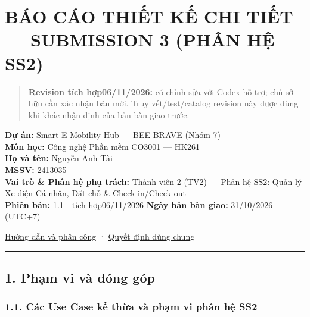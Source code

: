 \documentclass[11pt,a4paper]{article}
\begin{document}
\setcounter{page}{1}
\tableofcontents
\newpage

\hypertarget{buxe1o-cuxe1o-thiux1ebft-kux1ebf-chi-tiux1ebft-submission-3-phuxe2n-hux1ec7-ss2}{%
\section{BÁO CÁO THIẾT KẾ CHI TIẾT --- SUBMISSION 3 (PHÂN HỆ
SS2)}\label{buxe1o-cuxe1o-thiux1ebft-kux1ebf-chi-tiux1ebft-submission-3-phuxe2n-hux1ec7-ss2}}

\begin{quote}
\textbf{Revision tích hợp06/11/2026:} có chỉnh sửa với Codex hỗ trợ; chủ
sở hữu cần xác nhận bản mới. Truy vết/test/catalog revision này được
dùng khi khác nhận định của bản bàn giao trước.
\end{quote}

\textbf{Dự án:} Smart E-Mobility Hub --- BEE BRAVE (Nhóm 7)\\
\textbf{Môn học:} Công nghệ Phần mềm CO3001 --- HK261\\
\textbf{Họ và tên:} Nguyễn Anh Tài\\
\textbf{MSSV:} 2413035\\
\textbf{Vai trò \& Phân hệ phụ trách:} Thành viên 2 (TV2) --- Phân hệ
SS2: Quản lý Xe điện Cá nhân, Đặt chỗ \& Check-in/Check-out\\
\textbf{Phiên bản:} 1.1 - tích hợp06/11/2026 \textbf{Ngày bản bàn giao:}
31/10/2026 (UTC+7)

\href{../../../../GUIDANCE_FOR_SUB_3.md}{Hướng dẫn và phân công} ·
\href{../shared/shared_contracts.md}{Quyết định dùng chung}

\begin{center}\rule{0.5\linewidth}{0.5pt}\end{center}

\hypertarget{phux1ea1m-vi-vuxe0-ux111uxf3ng-guxf3p}{%
\subsection{1. Phạm vi và đóng
góp}\label{phux1ea1m-vi-vuxe0-ux111uxf3ng-guxf3p}}

\hypertarget{cuxe1c-use-case-kux1ebf-thux1eeba-vuxe0-phux1ea1m-vi-phuxe2n-hux1ec7-ss2}{%
\subsubsection{1.1. Các Use Case kế thừa và phạm vi phân hệ
SS2}\label{cuxe1c-use-case-kux1ebf-thux1eeba-vuxe0-phux1ea1m-vi-phuxe2n-hux1ec7-ss2}}
\end{document}
